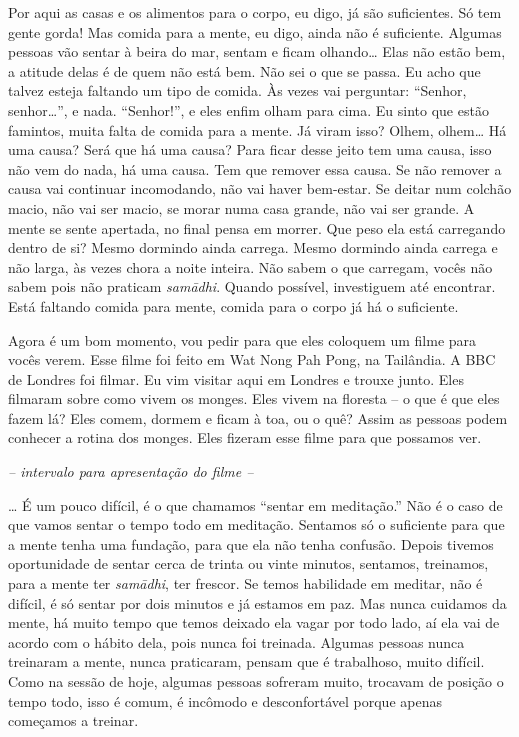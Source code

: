 Por aqui as casas e os alimentos para o corpo, eu digo, já são
suficientes. Só tem gente gorda! Mas comida para a mente, eu digo,
ainda não é suficiente. Algumas pessoas vão sentar à beira do mar,
sentam e ficam olhando\ldots{} Elas não estão bem, a atitude delas é de quem
não está bem. Não sei o que se passa. Eu acho que talvez esteja
faltando um tipo de comida. Às vezes vai perguntar: “Senhor, senhor\ldots{}”,
e nada. “Senhor!”, e eles enfim olham para cima. Eu sinto que estão
famintos, muita falta de comida para a mente. Já viram isso? Olhem,
olhem\ldots{} Há uma causa? Será que há uma causa? Para ficar desse jeito tem
uma causa, isso não vem do nada, há uma causa. Tem que remover essa
causa. Se não remover a causa vai continuar incomodando, não vai haver
bem-estar. Se deitar num colchão macio, não vai ser macio, se morar
numa casa grande, não vai ser grande. A mente se sente apertada, no
final pensa em morrer. Que peso ela está carregando dentro de si? Mesmo
dormindo ainda carrega. Mesmo dormindo ainda carrega e não larga, às
vezes chora a noite inteira. Não sabem o que carregam, vocês não sabem
pois não praticam \emph{samādhi}. Quando possível, investiguem até
encontrar. Está faltando comida para mente, comida para o corpo já há o
suficiente.

Agora é um bom momento, vou pedir para que eles coloquem um filme
para vocês verem. Esse filme foi feito em Wat Nong Pah Pong, na
Tailândia. A \textsc{BBC} de Londres foi filmar. Eu vim visitar aqui em Londres
e trouxe junto. Eles filmaram sobre como vivem os monges. Eles vivem na
floresta – o que é que eles fazem lá? Eles comem, dormem e ficam à toa,
ou o quê? Assim as pessoas podem conhecer a rotina dos monges. Eles
fizeram esse filme para que possamos ver. 

\clearpage

{\centering\itshape
-- intervalo para apresentação do filme --
\par}

\ldots{} É um pouco difícil, é o que chamamos “sentar em meditação.” Não
é o caso de que vamos sentar o tempo todo em meditação. Sentamos só o
suficiente para que a mente tenha uma fundação, para que ela não tenha
confusão. Depois tivemos oportunidade de sentar cerca de trinta ou
vinte minutos, sentamos, treinamos, para a mente ter
\emph{samādhi}, ter frescor. Se temos habilidade em meditar, não é
difícil, é só sentar por dois minutos e já estamos em paz. Mas nunca
cuidamos da mente, há muito tempo que temos deixado ela vagar por todo
lado, aí ela vai de acordo com o hábito dela, pois nunca foi treinada.
Algumas pessoas nunca treinaram a mente, nunca praticaram, pensam que é
trabalhoso, muito difícil. Como na sessão de hoje, algumas pessoas
sofreram muito, trocavam de posição o tempo todo, isso é comum, é
incômodo e desconfortável porque apenas começamos a treinar.

